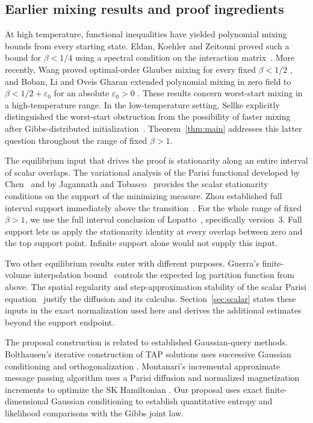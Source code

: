 \subsection{Earlier mixing results and proof ingredients}

At high temperature, functional inequalities have yielded polynomial
mixing bounds from every starting state. Eldan, Koehler and Zeitouni
proved such a bound for $\beta<1/4$ using a spectral condition on the
interaction matrix~\cite[Section~6]{EKZ2022}. More recently, Wang
proved optimal-order Glauber mixing for every fixed $\beta<1/2$
\cite[Theorem~1.1]{Wang2026}, and Boban, Li and Oveis Gharan
extended polynomial mixing in zero field to
$\beta<1/2+\varepsilon_0$ for an absolute $\varepsilon_0>0$
\cite[Corollary~1.6]{BLO2026}. These results concern worst-start
mixing in a high-temperature range. In the low-temperature setting,
Sellke explicitly distinguished the worst-start obstruction from the
possibility of faster mixing after Gibbs-distributed
initialization~\cite[discussion after Theorem~1.1]{Sellke2025}.
Theorem~\ref{thm:main} addresses this latter question throughout the
range of fixed $\beta>1$.

The equilibrium input that drives the proof is stationarity along an
entire interval of scalar overlaps. The variational analysis of the
Parisi functional developed by Chen~\cite[Theorem~2 and Proposition~1]{Chen2017} and by Jagannath
and Tobasco~\cite[Proposition~1.1 and Corollaries~3.6,~3.10]{JT2017}
provides the scalar stationarity conditions on the support of the
minimizing measure. Zhou established full interval support immediately
above the transition~\cite[Theorem~1]{Zhou2026}. For the whole range
of fixed $\beta>1$, we use the full interval conclusion of
Lopatto~\cite[Theorem~1.1]{Lopatto2026}, specifically version~3.
Full support lets us apply the stationarity identity at every overlap
between zero and the top support point. Infinite support alone would
not supply this input.

Two other equilibrium results enter with different purposes. Guerra's
finite-volume interpolation bound~\cite[Theorem~3]{Guerra2003}
controls the expected log partition function from above. The spatial
regularity and step-approximation stability of the scalar Parisi
equation~\cite[Propositions~1--2]{AC2015} justify the diffusion and its
calculus. Section~\ref{sec:scalar} states these inputs in the exact
normalization used here and derives the additional estimates beyond
the support endpoint.

The proposal construction is related to established Gaussian-query
methods. Bolthausen's iterative construction of TAP solutions uses
successive Gaussian conditioning and orthogonalization
\cite[Sections~2--3]{Bolthausen2014}. Montanari's incremental approximate
message passing algorithm uses a Parisi diffusion and normalized
magnetization increments to optimize the SK Hamiltonian
\cite[Sections~2--3]{Montanari2021}. Our proposal uses exact
finite-dimensional Gaussian conditioning to establish quantitative
entropy and likelihood comparisons with the Gibbs joint law.

